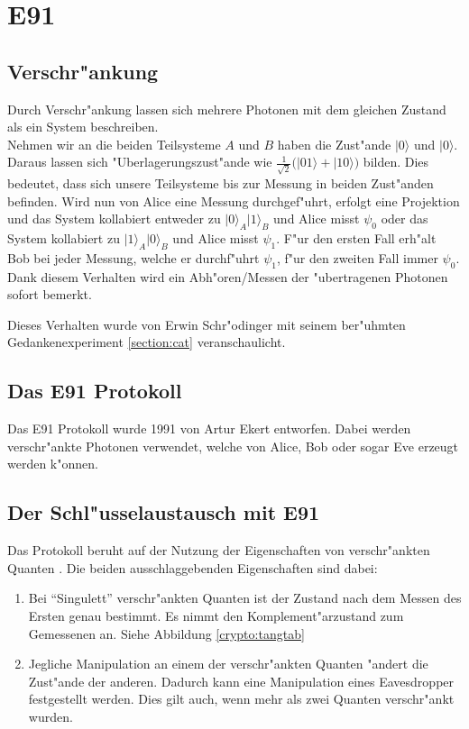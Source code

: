 \newcommand{\qcste}{$-22.5^{\circ}$}
\newcommand{\qcstz}{$0^{\circ}$}
\newcommand{\qcstd}{$22.5^{\circ}$}
\newcommand{\qcstv}{$45^{\circ}$}

\section{E91}
  \subsection{Verschr"ankung}
  Durch Verschr"ankung lassen sich mehrere Photonen mit dem gleichen Zustand als ein System beschreiben.\\
  Nehmen wir an die beiden Teilsysteme $A$ und $B$ haben die Zust"ande $|0\rangle$ und $|0\rangle$. Daraus
  lassen sich "Uberlagerungszust"ande wie $\frac{1}{\sqrt{2}}\big(|01\rangle + |10\rangle\big)$ bilden. Dies bedeutet, dass sich unsere
  Teilsysteme bis zur Messung in beiden Zust"anden befinden.
  Wird nun von Alice eine Messung durchgef"uhrt, erfolgt eine Projektion und
  das System kollabiert entweder zu $\lvert0\rangle_A|1\rangle_B$ und Alice misst $\psi_0$ oder
  das System kollabiert zu $\lvert1\rangle_A|0\rangle_B$ und Alice misst $\psi_1$.
  F"ur den ersten Fall erh"alt Bob bei jeder Messung,
  welche er durchf"uhrt $\psi_1$, f"ur den zweiten Fall immer $\psi_0$.
  Dank diesem Verhalten wird ein Abh"oren/Messen der "ubertragenen Photonen sofort bemerkt.

  Dieses Verhalten wurde von Erwin Schr"odinger mit seinem
  ber"uhmten Gedankenexperiment \ref{section:cat} veranschaulicht.

  \subsection{Das E91 Protokoll}
  Das E91 Protokoll wurde 1991 von Artur Ekert entworfen.
  Dabei werden verschr"ankte Photonen verwendet, welche von Alice, Bob oder sogar Eve erzeugt werden k"onnen.

  \subsection{Der Schl"usselaustausch mit E91}
  Das Protokoll beruht auf der Nutzung der Eigenschaften von verschr"ankten Quanten \cite{qc:verschraenkung}.
  Die beiden ausschlaggebenden Eigenschaften sind dabei:

  \begin{enumerate}
      \item Bei ``Singulett'' verschr"ankten Quanten ist der Zustand nach dem Messen des Ersten genau bestimmt.
        Es nimmt den Komplement"arzustand zum Gemessenen an.
        Siehe Abbildung \ref{crypto:tangtab}
      \item Jegliche Manipulation an einem der verschr"ankten Quanten "andert die Zust"ande der anderen.
        Dadurch kann eine Manipulation eines Eavesdropper festgestellt werden.
        Dies gilt auch, wenn mehr als zwei Quanten verschr"ankt wurden.
  \end{enumerate}

